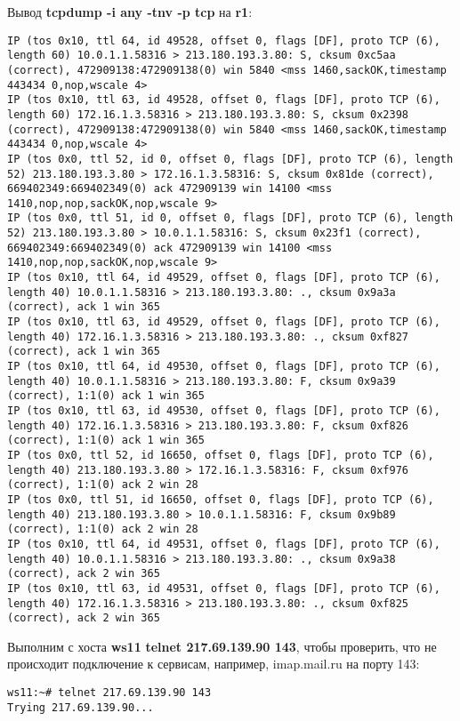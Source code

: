 \documentclass[a4paper,12pt]{article}
\begin{document}
Вывод \textbf{tcpdump -i any -tnv -p tcp} на \textbf{r1}:
\begin{Verbatim}
IP (tos 0x10, ttl 64, id 49528, offset 0, flags [DF], proto TCP (6), length 60) 10.0.1.1.58316 > 213.180.193.3.80: S, cksum 0xc5aa (correct), 472909138:472909138(0) win 5840 <mss 1460,sackOK,timestamp 443434 0,nop,wscale 4>
IP (tos 0x10, ttl 63, id 49528, offset 0, flags [DF], proto TCP (6), length 60) 172.16.1.3.58316 > 213.180.193.3.80: S, cksum 0x2398 (correct), 472909138:472909138(0) win 5840 <mss 1460,sackOK,timestamp 443434 0,nop,wscale 4>
IP (tos 0x0, ttl 52, id 0, offset 0, flags [DF], proto TCP (6), length 52) 213.180.193.3.80 > 172.16.1.3.58316: S, cksum 0x81de (correct), 669402349:669402349(0) ack 472909139 win 14100 <mss 1410,nop,nop,sackOK,nop,wscale 9>
IP (tos 0x0, ttl 51, id 0, offset 0, flags [DF], proto TCP (6), length 52) 213.180.193.3.80 > 10.0.1.1.58316: S, cksum 0x23f1 (correct), 669402349:669402349(0) ack 472909139 win 14100 <mss 1410,nop,nop,sackOK,nop,wscale 9>
IP (tos 0x10, ttl 64, id 49529, offset 0, flags [DF], proto TCP (6), length 40) 10.0.1.1.58316 > 213.180.193.3.80: ., cksum 0x9a3a (correct), ack 1 win 365
IP (tos 0x10, ttl 63, id 49529, offset 0, flags [DF], proto TCP (6), length 40) 172.16.1.3.58316 > 213.180.193.3.80: ., cksum 0xf827 (correct), ack 1 win 365
IP (tos 0x10, ttl 64, id 49530, offset 0, flags [DF], proto TCP (6), length 40) 10.0.1.1.58316 > 213.180.193.3.80: F, cksum 0x9a39 (correct), 1:1(0) ack 1 win 365
IP (tos 0x10, ttl 63, id 49530, offset 0, flags [DF], proto TCP (6), length 40) 172.16.1.3.58316 > 213.180.193.3.80: F, cksum 0xf826 (correct), 1:1(0) ack 1 win 365
IP (tos 0x0, ttl 52, id 16650, offset 0, flags [DF], proto TCP (6), length 40) 213.180.193.3.80 > 172.16.1.3.58316: F, cksum 0xf976 (correct), 1:1(0) ack 2 win 28
IP (tos 0x0, ttl 51, id 16650, offset 0, flags [DF], proto TCP (6), length 40) 213.180.193.3.80 > 10.0.1.1.58316: F, cksum 0x9b89 (correct), 1:1(0) ack 2 win 28
IP (tos 0x10, ttl 64, id 49531, offset 0, flags [DF], proto TCP (6), length 40) 10.0.1.1.58316 > 213.180.193.3.80: ., cksum 0x9a38 (correct), ack 2 win 365
IP (tos 0x10, ttl 63, id 49531, offset 0, flags [DF], proto TCP (6), length 40) 172.16.1.3.58316 > 213.180.193.3.80: ., cksum 0xf825 (correct), ack 2 win 365
\end{Verbatim}

Выполним с хоста \textbf{ws11} \textbf{telnet 217.69.139.90 143},  чтобы проверить,
что не происходит подключение к сервисам, например, imap.mail.ru на порту 143:
\begin{Verbatim}
ws11:~# telnet 217.69.139.90 143
Trying 217.69.139.90...
\end{Verbatim}
\end{document}
